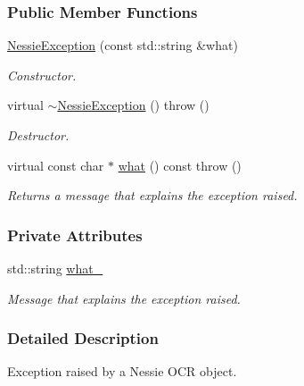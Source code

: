 \subsubsection*{Public Member Functions}
\begin{CompactItemize}
\item 
\hyperlink{class_nessie_exception_80c86c892438045635bf6a99da17e859}{NessieException} (const std::string \&what)
\begin{CompactList}\small\item\em Constructor. \item\end{CompactList}\item 
virtual \hyperlink{class_nessie_exception_19f44d2725dd53e2f10505a88e5773f2}{$\sim$NessieException} ()  throw ()
\begin{CompactList}\small\item\em Destructor. \item\end{CompactList}\item 
virtual const char $\ast$ \hyperlink{class_nessie_exception_a522c2ea164e88be0b26670170b33909}{what} () const   throw ()
\begin{CompactList}\small\item\em Returns a message that explains the exception raised. \item\end{CompactList}\end{CompactItemize}
\subsubsection*{Private Attributes}
\begin{CompactItemize}
\item 
\hypertarget{class_nessie_exception_3464c36d30d9baabd0b10ac4797d4b5b}{
std::string \hyperlink{class_nessie_exception_3464c36d30d9baabd0b10ac4797d4b5b}{what\_\-}}
\label{class_nessie_exception_3464c36d30d9baabd0b10ac4797d4b5b}

\begin{CompactList}\small\item\em Message that explains the exception raised. \item\end{CompactList}\end{CompactItemize}


\subsubsection{Detailed Description}
Exception raised by a Nessie OCR object. 

